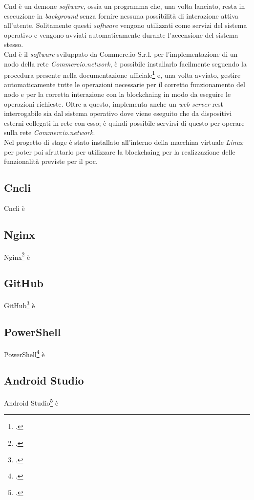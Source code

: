 Cnd è un demone \textit{software}, ossia un programma che, una volta lanciato, resta in esecuzione in \textit{background} senza fornire nessuna possibilità di interazione attiva all'utente. Solitamente questi \textit{software} vengono utilizzati come servizi del sistema operativo e vengono avviati automaticamente durante l'accensione del sistema stesso.\\
Cnd è il \textit{software} sviluppato da Commerc.io S.r.l. per l'implementazione di un nodo della rete \textit{Commercio.network}, è possibile installarlo facilmente seguendo la procedura presente nella documentazione ufficiale\footcite{manual:docs-commercio-network} e, una volta avviato, gestire automaticamente tutte le operazioni necessarie per il corretto funzionamento del nodo e per la corretta interazione con la \gls{blockchaing} in modo da eseguire le operazioni richieste. Oltre a questo, implementa anche un \textit{web server} \gls{rest}\glsfirstoccur{} interrogabile sia dal sistema operativo dove viene eseguito che da dispositivi esterni collegati in rete con esso; è quindi possibile servirsi di questo per operare sulla rete \textit{Commercio.network}.\\
Nel progetto di stage è stato installato all'interno della macchina virtuale \textit{Linux} per poter poi sfruttarlo per utilizzare la \gls{blockchaing} per la realizzazione delle funzionalità previste per il \gls{poc}. 

\subsection*{Cncli}

Cncli è

\subsection*{Nginx}

Nginx\footcite{site:nginx} è

\subsection*{GitHub}

GitHub\footcite{site:github} è

\subsection*{PowerShell}

PowerShell\footcite{site:powershell} è

\subsection*{Android Studio}

Android Studio\footcite{site:android-studio} è

